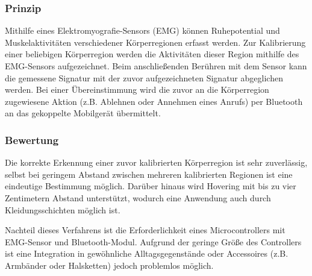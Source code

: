 \subsubsection{Prinzip}
Mithilfe eines Elektromyografie-Sensors (EMG) können Ruhepotential und Muskelaktivitäten verschiedener Körperregionen erfasst werden. Zur Kalibrierung einer beliebigen Körperregion werden die Aktivitäten dieser Region mithilfe des EMG-Sensors aufgezeichnet. Beim anschließenden Berühren mit dem Sensor kann die gemessene Signatur mit der zuvor aufgezeichneten Signatur abgeglichen werden. Bei einer Übereinstimmung wird die zuvor an die Körperregion zugewiesene Aktion (z.B. Ablehnen oder Annehmen eines Anrufs) per Bluetooth an das gekoppelte Mobilgerät übermittelt. 

\subsubsection{Bewertung}
Die korrekte Erkennung einer zuvor kalibrierten Körperregion ist sehr zuverlässig, selbst bei geringem Abstand zwischen mehreren kalibrierten Regionen ist eine eindeutige Bestimmung möglich. Darüber hinaus wird Hovering  mit bis zu vier Zentimetern Abstand unterstützt, wodurch eine Anwendung auch durch Kleidungsschichten möglich ist.

Nachteil dieses Verfahrens ist die Erforderlichkeit eines Microcontrollers mit EMG-Sensor und Bluetooth-Modul. Aufgrund der geringe Größe des Controllers ist eine Integration in gewöhnliche Alltagsgegenstände oder Accessoires (z.B. Armbänder oder Halsketten) jedoch problemlos möglich.
